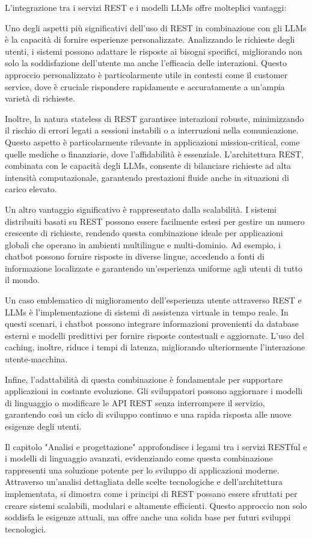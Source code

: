 \documentclass[a4paper,twoside,12pt]{toptesi}
\begin{document}
L'integrazione tra i servizi REST e i modelli LLMs offre molteplici vantaggi:

Uno degli aspetti più significativi dell'uso di REST in combinazione con gli LLMs è la capacità di fornire esperienze personalizzate. Analizzando le richieste degli utenti, i sistemi possono adattare le risposte ai bisogni specifici, migliorando non solo la soddisfazione dell'utente ma anche l'efficacia delle interazioni. Questo approccio personalizzato è particolarmente utile in contesti come il customer service, dove è cruciale rispondere rapidamente e accuratamente a un'ampia varietà di richieste.

Inoltre, la natura stateless di REST garantisce interazioni robuste, minimizzando il rischio di errori legati a sessioni instabili o a interruzioni nella comunicazione. Questo aspetto è particolarmente rilevante in applicazioni mission-critical, come quelle mediche o finanziarie, dove l'affidabilità è essenziale. L'architettura REST, combinata con le capacità degli LLMs, consente di bilanciare richieste ad alta intensità computazionale, garantendo prestazioni fluide anche in situazioni di carico elevato.

Un altro vantaggio significativo è rappresentato dalla scalabilità. I sistemi distribuiti basati su REST possono essere facilmente estesi per gestire un numero crescente di richieste, rendendo questa combinazione ideale per applicazioni globali che operano in ambienti multilingue e multi-dominio. Ad esempio, i chatbot possono fornire risposte in diverse lingue, accedendo a fonti di informazione localizzate e garantendo un'esperienza uniforme agli utenti di tutto il mondo.

Un caso emblematico di miglioramento dell'esperienza utente attraverso REST e LLMs è l'implementazione di sistemi di assistenza virtuale in tempo reale. In questi scenari, i chatbot possono integrare informazioni provenienti da database esterni e modelli predittivi per fornire risposte contestuali e aggiornate. L'uso del caching, inoltre, riduce i tempi di latenza, migliorando ulteriormente l'interazione utente-macchina.

Infine, l'adattabilità di questa combinazione è fondamentale per supportare applicazioni in costante evoluzione. Gli sviluppatori possono aggiornare i modelli di linguaggio o modificare le API REST senza interrompere il servizio, garantendo così un ciclo di sviluppo continuo e una rapida risposta alle nuove esigenze degli utenti.

Il capitolo "Analisi e progettazione" approfondisce i legami tra i servizi RESTful e i modelli di linguaggio avanzati, evidenziando come questa combinazione rappresenti una soluzione potente per lo sviluppo di applicazioni moderne. Attraverso un'analisi dettagliata delle scelte tecnologiche e dell'architettura implementata, si dimostra come i principi di REST possano essere sfruttati per creare sistemi scalabili, modulari e altamente efficienti. Questo approccio non solo soddisfa le esigenze attuali, ma offre anche una solida base per futuri sviluppi tecnologici.
\end{document}
